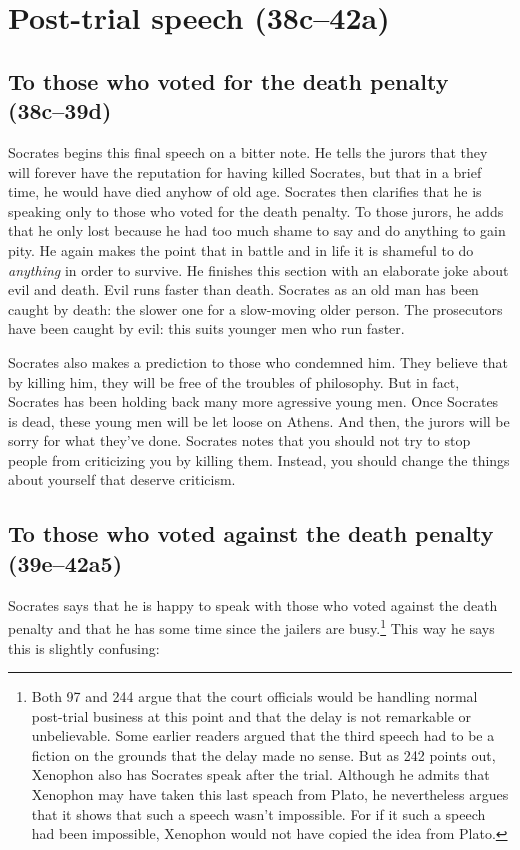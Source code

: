 \documentclass[11pt]{article}
\begin{document}
\section{Post-trial speech (38c--42a)}

\subsection{To those who voted for the death penalty (38c--39d)}

Socrates begins this final speech on a bitter note.  He tells the jurors that they will forever have the reputation for having killed Socrates, but that in a brief time, he would have died anyhow of old age.  Socrates then clarifies that he is speaking only to those who voted for the death penalty.  To those jurors, he adds that he only lost because he had too much shame to say and do anything to gain pity.  He again makes the point that in battle and in life it is shameful to do \emph{anything} in order to survive.  He finishes this section with an elaborate joke about evil and death. Evil runs faster than death.  Socrates as an old man has been caught by death: the slower one for a slow-moving older person.  The prosecutors have been caught by evil: this suits younger men who run faster.

Socrates also makes a prediction to those who condemned him.  They believe that by killing him, they will be free of the troubles of philosophy.  But in fact, Socrates has been holding back many more agressive young men.  Once Socrates is dead, these young men will be let loose on Athens.  And then, the jurors will be sorry for what they've done.  Socrates notes that you should not try to stop people from criticizing you by killing them.  Instead, you should change the things about yourself that deserve criticism.

\subsection{To those who voted against the death penalty (39e--42a5)}

Socrates says that he is happy to speak with those who voted against the death penalty and that he has some time since the jailers are busy.\footnote{Both \citet{adam1914} 97 and \citet{burnet1924} 244 argue that the court officials would be handling normal post-trial business at this point and that the delay is not remarkable or unbelievable.  Some earlier readers argued that the third speech had to be a fiction on the grounds that the delay made no sense.  But as \citet{burnet1924} 242 points out, Xenophon also has Socrates speak after the trial.  Although he admits that Xenophon may have taken this last speach from Plato, he nevertheless argues that it shows that such a speech wasn't impossible.  For if it such a speech had been impossible, Xenophon would not have copied the idea from Plato.}  This way he says this is slightly confusing:
\end{document}
